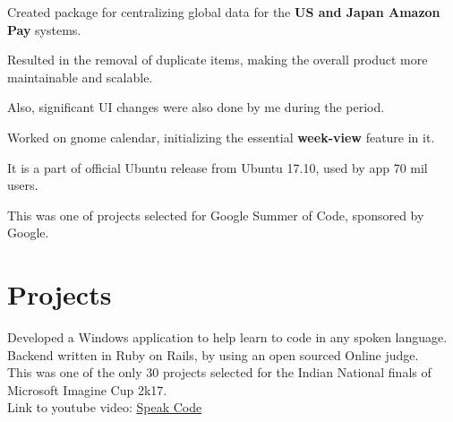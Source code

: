 \documentclass[a4paper]{deedy-resume} %
\begin{document}
\begin{minipage}[t]{0.66\textwidth}
\begin{tightitemize}
\item Created package for centralizing global data for the \textbf{US and Japan Amazon Pay} systems.
\item Resulted in the removal of duplicate items, making the overall product more maintainable and scalable.
\item Also, significant UI changes were also done by me during the period.
\end{tightitemize}

\sectionspace %



\begin{tightitemize}
\item Worked on gnome calendar, initializing the essential \textbf{week-view} feature in it.
\item It is a part of official Ubuntu release from Ubuntu 17.10, used by app 70 mil users.
\item This was one of projects selected for Google Summer of Code, sponsored by Google.
\end{tightitemize}

\sectionspace %


\section{Projects}


Developed a Windows application to help learn to code in any spoken language. \\
Backend written in Ruby on Rails, by using an open sourced Online judge. \\
This was one of the only 30 projects selected for the Indian National finals of Microsoft Imagine Cup 2k17. \\
Link to youtube video: \href{https://www.youtube.com/watch?v=hO4iSh1bSC0}{Speak Code}


\end{minipage}
\end{document}
